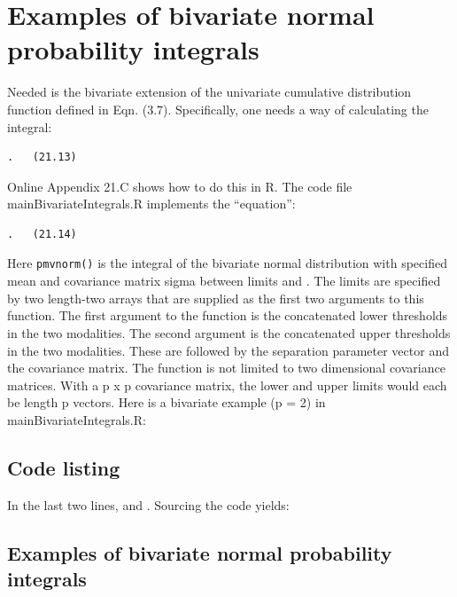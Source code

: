 \documentclass[
]{book}
\begin{document}
\hypertarget{bivariate-binormal-model-multivariate-density-examples}{%
\section{Examples of bivariate normal probability integrals}\label{bivariate-binormal-model-multivariate-density-examples}}

Needed is the bivariate extension of the univariate cumulative distribution function defined in Eqn. (3.7). Specifically, one needs a way of calculating the integral:

\begin{verbatim}
.   (21.13)
\end{verbatim}

Online Appendix 21.C shows how to do this in R. The code file mainBivariateIntegrals.R implements the ``equation'':

\begin{verbatim}
.   (21.14)
\end{verbatim}

Here \texttt{pmvnorm()} is the integral of the bivariate normal distribution with specified mean and covariance matrix sigma between limits and . The limits are specified by two length-two arrays that are supplied as the first two arguments to this function. The first argument to the function is the concatenated lower thresholds in the two modalities. The second argument is the concatenated upper thresholds in the two modalities. These are followed by the separation parameter vector and the covariance matrix. The function is not limited to two dimensional covariance matrices. With a p x p covariance matrix, the lower and upper limits would each be length p vectors. Here is a bivariate example (p = 2) in mainBivariateIntegrals.R:

\hypertarget{bivariate-binormal-model-multivariate-density-estimation-code}{%
\subsection{Code listing}\label{bivariate-binormal-model-multivariate-density-estimation-code}}

In the last two lines, and . Sourcing the code yields:

\hypertarget{bivariate-binormal-model-examples-integrals}{%
\subsection{Examples of bivariate normal probability integrals}\label{bivariate-binormal-model-examples-integrals}}
\end{document}
